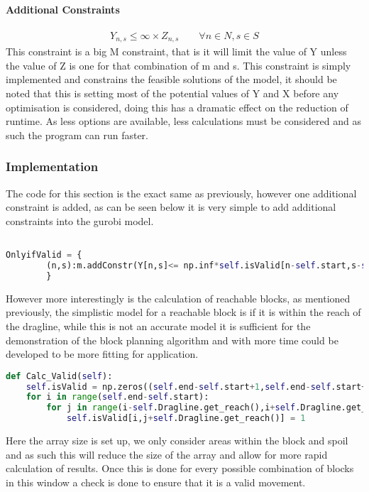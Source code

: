 \paragraph*{Additional Constraints}
\begin{align}
\label{MIP:Valid}
Y_{n,s}\leq \infty\times Z_{n,s} \qquad \forall n \in N , s\in S
\end{align}
This constraint is a big M constraint, that is it will limit the value of Y unless the value of Z is one for that combination of m and s. This constraint is simply implemented and constrains the feasible solutions of the model, it should be noted that this is setting most of the potential values of Y and X before any optimisation is considered, doing this has a dramatic effect on the reduction of runtime. As less options are available, less calculations must be considered and as such the program can run faster.
\subsubsection{Implementation}
The code for this section is the exact same as previously, however one additional constraint is added, as can be seen below it is very simple to add additional constraints into the gurobi model.
\begin{lstlisting}[language=python]

OnlyifValid = {
		(n,s):m.addConstr(Y[n,s]<= np.inf*self.isValid[n-self.start,s-self.start-self.Dragline.get_reach()]) for n in self.N for s in self.S
		}
\end{lstlisting}
However more interestingly is the calculation of reachable blocks, as mentioned previously, the simplistic model for a reachable block is if it is within the reach of the dragline, while this is not an accurate model it is sufficient for the demonstration of the block planning algorithm and with more time could be developed to be more fitting for application. 
\begin{lstlisting}[language = python]
def Calc_Valid(self):
	self.isValid = np.zeros((self.end-self.start+1,self.end-self.start+2*self.Dragline.get_reach()+1))
	for i in range(self.end-self.start):
		for j in range(i-self.Dragline.get_reach(),i+self.Dragline.get_reach()):
			self.isValid[i,j+self.Dragline.get_reach()] = 1
\end{lstlisting}
Here the array size is set up, we only consider areas within the block and spoil and as such this will reduce the size of the array and allow for more rapid calculation of results. Once this is done for every possible combination of blocks in this window a check is done to ensure that it is a valid movement. 
